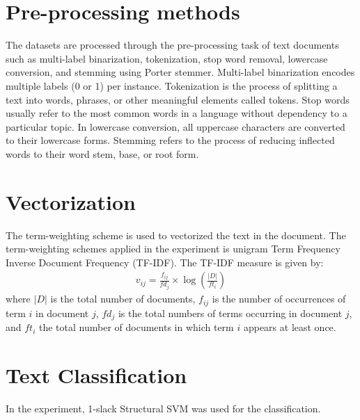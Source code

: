 \section{Pre-processing methods}
The datasets are processed through the pre-processing task of text documents such as multi-label binarization, tokenization, stop word removal, lowercase conversion, and stemming using Porter stemmer. Multi-label binarization encodes multiple labels (0 or 1) per instance. Tokenization is the process of splitting a text into words, phrases, or other meaningful elements called tokens. Stop words usually refer to the most common words in a language without dependency to a particular topic. In lowercase conversion, all uppercase characters are converted to their lowercase forms. Stemming refers to the process of reducing inflected words to their word stem, base, or root form.

\section{Vectorization}
The term-weighting scheme is used to vectorized the text in the document. The term-weighting schemes applied in the experiment is unigram Term Frequency Inverse Document Frequency (TF-IDF). The TF-IDF measure is given by:
\begin{align*}
\label{tf_idf}
v_{ij} = \frac{f_{ij}}{fd_j} \times \log \left( \frac{|D|}{ft_i} \right)
\end{align*}
where $|D|$ is the total number of documents, $f_{ij}$ is the number of occurrences of term $i$ in document $j$, $fd_j$ is the total numbers of terms occurring in document $j$, and $ft_i$ the total number of documents in which term $i$ appears at least once.

\section{Text Classification}
In the experiment, 1-slack Structural SVM was used for the classification.
